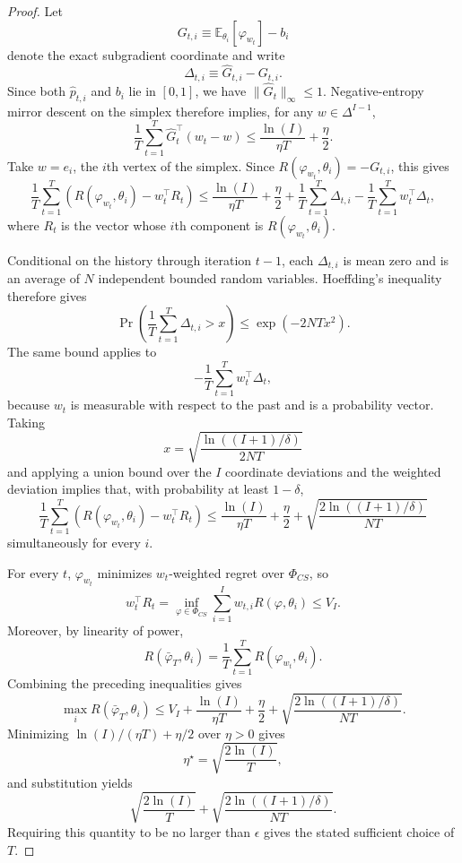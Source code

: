 \documentclass{article}
\theoremstyle{definition}
\theoremstyle{plain}
\theoremstyle{remark}
\begin{document}
\begin{proof}
Let
\[
G_{t,i}\equiv\mathbb{E}_{\theta_i}[\varphi_{w_t}]-b_i
\]
denote the exact subgradient coordinate and write
\[
\Delta_{t,i}\equiv\widehat G_{t,i}-G_{t,i}.
\]
Since both $\widehat p_{t,i}$ and $b_i$ lie in $[0,1]$, we have $\|\widehat G_t\|_\infty\leq1$. Negative-entropy mirror descent on the simplex therefore implies, for any $w\in\Delta^{I-1}$,
\[
\frac{1}{T}\sum_{t=1}^T\widehat G_t^\top(w_t-w)\leq\frac{\ln(I)}{\eta T}+\frac{\eta}{2}.
\]
Take $w=e_i$, the $i$th vertex of the simplex. Since $R(\varphi_{w_t},\theta_i)=-G_{t,i}$, this gives
\[
\frac{1}{T}\sum_{t=1}^T\left(R(\varphi_{w_t},\theta_i)-w_t^\top R_t\right)\leq\frac{\ln(I)}{\eta T}+\frac{\eta}{2}+\frac{1}{T}\sum_{t=1}^T\Delta_{t,i}-\frac{1}{T}\sum_{t=1}^Tw_t^\top\Delta_t,
\]
where $R_t$ is the vector whose $i$th component is $R(\varphi_{w_t},\theta_i)$.

Conditional on the history through iteration $t-1$, each $\Delta_{t,i}$ is mean zero and is an average of $N$ independent bounded random variables. Hoeffding's inequality therefore gives
\[
\Pr\left(\frac{1}{T}\sum_{t=1}^T\Delta_{t,i}>x\right)\leq\exp(-2NTx^2).
\]
The same bound applies to
\[
-\frac{1}{T}\sum_{t=1}^Tw_t^\top\Delta_t,
\]
because $w_t$ is measurable with respect to the past and is a probability vector. Taking
\[
x=\sqrt{\frac{\ln((I+1)/\delta)}{2NT}}
\]
and applying a union bound over the $I$ coordinate deviations and the weighted deviation implies that, with probability at least $1-\delta$,
\[
\frac{1}{T}\sum_{t=1}^T\left(R(\varphi_{w_t},\theta_i)-w_t^\top R_t\right)\leq\frac{\ln(I)}{\eta T}+\frac{\eta}{2}+\sqrt{\frac{2\ln((I+1)/\delta)}{NT}}
\]
simultaneously for every $i$.

For every $t$, $\varphi_{w_t}$ minimizes $w_t$-weighted regret over $\Phi_{CS}$, so
\[
w_t^\top R_t=\inf_{\varphi\in\Phi_{CS}}\sum_{i=1}^Iw_{t,i}R(\varphi,\theta_i)\leq V_I.
\]
Moreover, by linearity of power,
\[
R(\bar{\varphi}_T,\theta_i)=\frac{1}{T}\sum_{t=1}^TR(\varphi_{w_t},\theta_i).
\]
Combining the preceding inequalities gives
\[
\max_iR(\bar{\varphi}_T,\theta_i)\leq V_I+\frac{\ln(I)}{\eta T}+\frac{\eta}{2}+\sqrt{\frac{2\ln((I+1)/\delta)}{NT}}.
\]
Minimizing $\ln(I)/(\eta T)+\eta/2$ over $\eta>0$ gives
\[
\eta^\star=\sqrt{\frac{2\ln(I)}{T}},
\]
and substitution yields
\[
\sqrt{\frac{2\ln(I)}{T}}+\sqrt{\frac{2\ln((I+1)/\delta)}{NT}}.
\]
Requiring this quantity to be no larger than $\epsilon$ gives the stated sufficient choice of $T$.
\end{proof}
\end{document}
